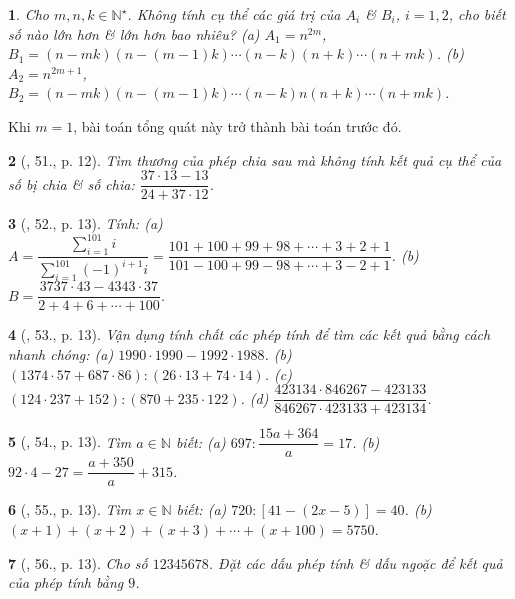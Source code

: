 \documentclass{article}
\newtheorem{baitoan}{}
\begin{document}
\begin{baitoan}
	Cho $m,n,k\in\mathbb{N}^\star$. Không tính cụ thể các giá trị của $A_i$ \& $B_i$, $i = 1,2$, cho biết số nào lớn hơn \& lớn hơn bao nhiêu? (a) $A_1 = n^{2m}$, $B_1 = (n - mk)(n - (m - 1)k)\cdots(n - k)(n + k)\cdots(n + mk)$. (b) $A_2 = n^{2m + 1}$, $B_2 = (n - mk)(n - (m - 1)k)\cdots(n - k)n(n + k)\cdots(n + mk)$.
\end{baitoan}
Khi $m = 1$, bài toán tổng quát này trở thành bài toán trước đó.

\begin{baitoan}[\cite{Binh_Toan_6_tap_1}, 51., p. 12]
	Tìm thương của phép chia sau mà không tính kết quả cụ thể của số bị chia \& số chia: $\dfrac{37\cdot13 - 13}{24 + 37\cdot12}$.
\end{baitoan}

\begin{baitoan}[\cite{Binh_Toan_6_tap_1}, 52., p. 13]
	Tính: (a) $A = \dfrac{\sum_{i=1}^{101} i}{\sum_{i=1}^{101} (-1)^{i+1}i} = \dfrac{101 + 100 + 99 + 98 + \cdots + 3 + 2 + 1}{101 - 100 + 99 - 98 + \cdots + 3 - 2 + 1}$. (b) $B = \dfrac{3737\cdot43 - 4343\cdot37}{2 + 4 + 6 + \cdots + 100}$.
\end{baitoan}

\begin{baitoan}[\cite{Binh_Toan_6_tap_1}, 53., p. 13]
	Vận dụng tính chất các phép tính để tìm các kết quả bằng cách nhanh chóng: (a) $1990\cdot1990 - 1992\cdot1988$. (b) $(1374\cdot57 + 687\cdot86):(26\cdot13 + 74\cdot14)$. (c) $(124\cdot237 + 152):(870 + 235\cdot122)$. (d) $\dfrac{423134\cdot846267 - 423133}{846267\cdot423133 + 423134}$.
\end{baitoan}

\begin{baitoan}[\cite{Binh_Toan_6_tap_1}, 54., p. 13]
	Tìm $a\in\mathbb{N}$ biết: (a) $697:\dfrac{15a + 364}{a} = 17$. (b) $92\cdot4 - 27 = \dfrac{a + 350}{a} + 315$.
\end{baitoan}

\begin{baitoan}[\cite{Binh_Toan_6_tap_1}, 55., p. 13]
	Tìm $x\in\mathbb{N}$ biết: (a) $720:[41 - (2x - 5)] = 40$. (b) $(x + 1) + (x + 2) + (x + 3) + \cdots + (x + 100) = 5750$.
\end{baitoan}

\begin{baitoan}[\cite{Binh_Toan_6_tap_1}, 56., p. 13]
	Cho số $12345678$. Đặt các dấu phép tính \& dấu ngoặc để kết quả của phép tính bằng $9$.
\end{baitoan}
\end{document}

